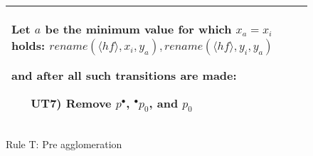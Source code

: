 \begin{figure}[h!]
\begin{adjustbox}{center}
\begin{tabular}{|p{70mm}|p{70mm}|}
\begin{itemize}[leftmargin=10mm]
            Let $a$ be the minimum value for which $x_a = x_i$ holds:\newline
            $rename(\langle hf \rangle, x_i, y_a), rename(\langle hf \rangle, y_i, y_a)$
        \end{itemize}
        and after all such transitions are made:
        \begin{itemize}[leftmargin=10mm]
            \item[UT7)] Remove $p^\bullet$, ${}^\bullet p_0$, and $p_0$
        \end{itemize} \\ \hline
        \end{tabular}
    \end{adjustbox}
    \caption{Rule T: Pre agglomeration}
    \label{fig:rule_t_cpn}
\end{figure}

